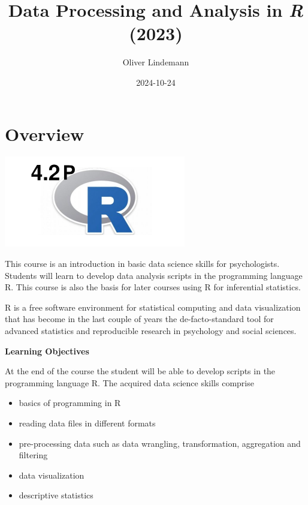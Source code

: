\documentclass[
]{scrartcl}
\title{Data Processing and Analysis in \emph{R} (2023)}
\author{Oliver Lindemann}
\date{2024-10-24}
\providecommand{\tightlist}{%
  \setlength{\itemsep}{0pt}\setlength{\parskip}{0pt}}
\begin{document}
\maketitle

{
\hypersetup{linkcolor=}
\setcounter{tocdepth}{2}
\tableofcontents
}
\newpage

\hypertarget{overview}{%
\section*{Overview}\label{overview}}

\begin{center}\includegraphics[width=300px]{images/R-course-logo} \end{center}

This course is an introduction in basic data science skills for psychologists. Students will learn to develop data analysis scripts in the programming language R. This course is also the basis for later courses using R for inferential statistics.

R is a free software environment for statistical computing and data visualization that has become in the last couple of years the de-facto-standard tool for advanced statistics and reproducible research in psychology and social sciences.

\textbf{Learning Objectives}

At the end of the course the student will be able to develop scripts in the programming language R. The acquired data science skills comprise

\begin{itemize}
\tightlist
\item
  basics of programming in R
\item
  reading data files in different formats
\item
  pre-processing data such as data wrangling, transformation, aggregation and filtering
\item
  data visualization
\item
  descriptive statistics
\end{itemize}
\end{document}
